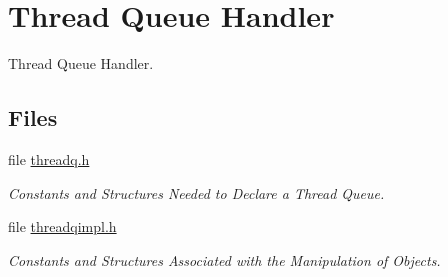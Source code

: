 \hypertarget{group__RTEMSScoreThreadQueue}{}\section{Thread Queue Handler}
\label{group__RTEMSScoreThreadQueue}


Thread Queue Handler.  


\subsection*{Files}
\begin{DoxyCompactItemize}
\item 
file \mbox{\hyperlink{threadq_8h}{threadq.\+h}}
\begin{DoxyCompactList}\small\item\em Constants and Structures Needed to Declare a Thread Queue. \end{DoxyCompactList}\item 
file \mbox{\hyperlink{threadqimpl_8h}{threadqimpl.\+h}}
\begin{DoxyCompactList}\small\item\em Constants and Structures Associated with the Manipulation of Objects. \end{DoxyCompactList}\end{DoxyCompactItemize}
